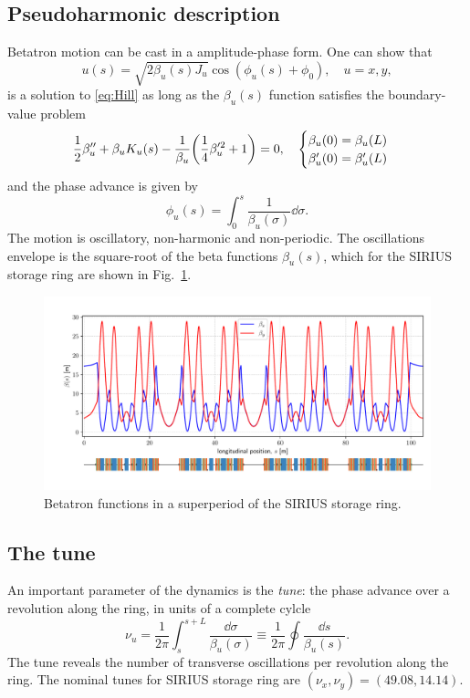 \subsection{Pseudoharmonic description}
Betatron motion can be cast in a amplitude-phase form. One can show that
\begin{equation}
    u(s) = \sqrt{2\beta_u(s) J_u}\cos(\phi_u(s) + \phi_0),\quad u=x,y,
    \label{eq:pseudo_harmon}
\end{equation}
is a solution to \eqref{eq:Hill} as long as the $\beta_u(s)$ function satisfies the boundary-value problem
\begin{equation}
    \frac{1}{2}\beta_{u}^{\prime\prime}+\beta_{u} K_u(s) - \frac{1}{\beta_{u}}\qty(\frac{1}{4}\beta_{u}^{\prime 2} + 1 ) = 0, \quad
        \begin{cases}
            \beta_{u}(0) = \beta_{u}(L)\\ \beta_{u}^{\prime}(0) = \beta_{u}^{\prime}(L)
        \end{cases}
    \label{eq:beta_eq}
\end{equation}
and the phase advance is given by
    \begin{equation}
        \phi_u(s) = \int_{0}^{s}\frac{1}{\beta_u(\sigma)}\dd\sigma.
   \end{equation}
The motion is oscillatory, non-harmonic and non-periodic. The oscillations envelope is the square-root of the beta functions $\beta_u(s)$, which for the SIRIUS storage ring are shown in Fig.~\ref{betafunc}.
\begin{figure}[htb]
    \centering
    \includegraphics[width=\textwidth]{Images/beta_functions.pdf}
    \caption[Betatron functions in a superperiod of the SIRIUS storage ring]{Betatron functions in a superperiod of the SIRIUS storage ring.}
    \label{betafunc}
\end{figure}
\subsection{The tune}
An important parameter of the dynamics is the \textit{tune}: the phase advance over a revolution along the ring, in units of a complete cylcle
\begin{equation*}
    \nu_u=\frac{1}{2\pi}\int_{s}^{s+L}\frac{\dd \sigma}{\beta_u(\sigma)}\equiv\frac{1}{2\pi}\oint\frac{\dd s}{\beta_u(s)}.
\end{equation*}
The tune reveals the number of transverse oscillations per revolution along the ring. The nominal tunes for SIRIUS storage ring are $(\nu_x, \nu_y)=(49.08, 14.14)$.

